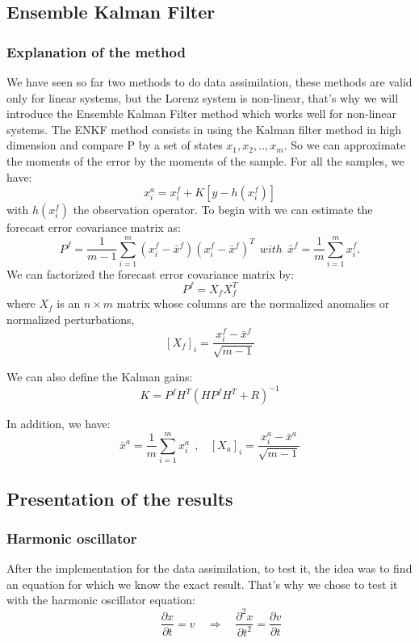 \subsection{Ensemble Kalman Filter}
\subsubsection{Explanation of the method}
\noindent We have seen so far two methods to do data assimilation, these methods are valid only for linear systems, but the Lorenz system is non-linear, that's why we will introduce the Ensemble Kalman Filter method which works well for non-linear systems. The ENKF method consists in using the Kalman filter method in high dimension and compare P by a set of states $x_1,x_2,..,x_{m}$. So we can approximate the moments of the error by the moments of the sample.
For all the samples, we have:
$$x_i^a=x_i^f+K[y-h(x_i^f)]$$
with $h(x_i^f)$ the observation operator.
\newline \noindent To begin with we can estimate the
forecast error covariance matrix as:
$$P^f=\frac{1}{m-1}\sum_{i=1}^{m}(x_i^f-\bar{x}^f)(x_i^f-\bar{x}^f)^T~~with~~\bar{x}^f=\frac{1}{m}\sum_{i=1}^{m}x_i^f .$$ 
\noindent We can factorized the forecast error covariance matrix by:
$$P^f=X_f X_f^T$$
where $X_f$ is an $n \times m$ matrix whose columns are the normalized anomalies or normalized perturbations,
$$[X_f]_i=\frac{x_i^f-\bar{x}^f}{\sqrt{m-1}}$$

\noindent We can also define the Kalman gains: 
$$K=P^f H^T(HP^f H^T+R)^{-1}$$

\noindent In addition, we have:
$$
\bar{x}^a=\frac{1}{m}\sum_{i=1}^mx_i^a~~,~~~~[X_a]_i=\frac{x_i^a-\bar{x}^a}{\sqrt{m-1}} $$
\subsection{Presentation of the results}
\subsubsection{Harmonic oscillator}
\noindent After the implementation for the data assimilation, to test it, the idea was to find an equation for which we know the exact result. That's why we chose to test it with the harmonic oscillator equation:
$$\qquad \frac{\partial x}{\partial t}=v \quad \Rightarrow \quad \frac{\partial^2 x}{\partial t^2}=\frac{\partial v}{\partial t}$$

